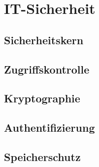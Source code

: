 \section{IT-Sicherheit}

\subsection{Sicherheitskern}

\subsection{Zugriffskontrolle}

\subsection{Kryptographie}

\subsection{Authentifizierung}

\subsection{Speicherschutz}
